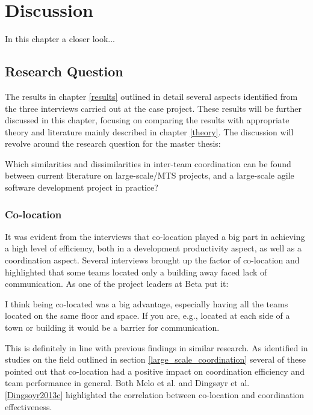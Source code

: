 \chapter{Discussion}
\label{disc}

\minitoc

In this chapter a closer look...
\newpage

\section{Research Question}

The results in chapter \ref{results} outlined in detail several aspects identified from the three interviews carried out at the case project. These results will be further discussed in this chapter, focusing on comparing the results with appropriate theory and literature mainly described in chapter \ref{theory}. The discussion will revolve around the research question for the master thesis:

\begin{fancyquotes}
Which similarities and dissimilarities in inter-team coordination can be found between current literature on large-scale/MTS projects, and a large-scale agile software development project in practice?
\end{fancyquotes}

\subsection{Co-location}

It was evident from the interviews that co-location played a big part in achieving a high level of efficiency, both in a development productivity aspect, as well as a coordination aspect. Several interviews brought up the factor of co-location and highlighted that some teams located only a building away faced lack of communication. As one of the project leaders at Beta put it:

\begin{fancyquotes}
I think being co-located was a big advantage, especially having all the teams located on the same floor and space. If you are, e.g., located at each side of a town or building it would be a barrier for communication.
\end{fancyquotes}

This is definitely in line with previous findings in similar research. As identified in studies on the field outlined in section \ref{large_scale_coordination} several of these pointed out that co-location had a positive impact on coordination efficiency and team performance in general. Both Melo et al. \cite{Melo2013} and Dingsøyr et al. \ref{Dingsoyr2013c} highlighted the correlation between co-location and coordination effectiveness.

